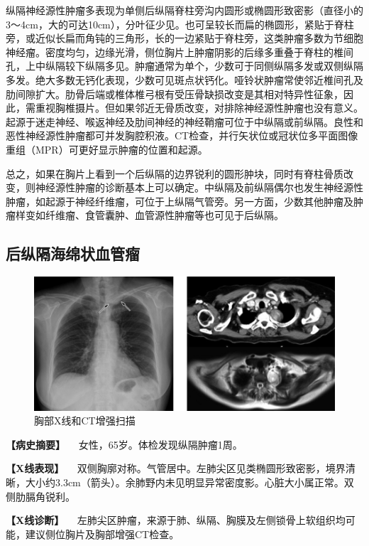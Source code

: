 纵隔神经源性肿瘤多表现为单侧后纵隔脊柱旁沟内圆形或椭圆形致密影（直径小的3～4cm，大的可达10cm），分叶征少见。也可呈较长而扁的椭圆形，紧贴于脊柱旁，或近似长扁而角钝的三角形，长的一边紧贴于脊柱旁，这类肿瘤多数为节细胞神经瘤。密度均匀，边缘光滑，侧位胸片上肿瘤阴影的后缘多重叠于脊柱的椎间孔，上中纵隔较下纵隔多见。肿瘤通常为单个，少数可于同侧纵隔多发或双侧纵隔多发。绝大多数无钙化表现，少数可见斑点状钙化。哑铃状肿瘤常使邻近椎间孔及肋间隙扩大。肋骨后端或椎体椎弓根有受压骨缺损改变是其相对特异性征象，因此，需重视胸椎摄片。但如果邻近无骨质改变，对排除神经源性肿瘤也没有意义。起源于迷走神经、喉返神经及肋间神经的神经鞘瘤可位于中纵隔或前纵隔。良性和恶性神经源性肿瘤都可并发胸腔积液。CT检查，并行矢状位或冠状位多平面图像重组（MPR）可更好显示肿瘤的位置和起源。

总之，如果在胸片上看到一个后纵隔的边界锐利的圆形肿块，同时有脊柱骨质改变，则神经源性肿瘤的诊断基本上可以确定。中纵隔及前纵隔偶尔也发生神经源性肿瘤，如起源于神经纤维瘤，可位于上纵隔气管旁。另一方面，少数其他肿瘤及肿瘤样变如纤维瘤、食管囊肿、血管源性肿瘤等也可见于后纵隔。

\subsection{后纵隔海绵状血管瘤}

\begin{figure}[!htbp]
 \centering
 \includegraphics{./images/Image00201.jpg}
 \captionsetup{justification=centering}
 \caption{胸部X线和CT增强扫描}
 \label{fig3-12-8}
  \end{figure} 

\textbf{【病史摘要】} 　女性，65岁。体检发现纵隔肿瘤1周。

\textbf{【X线表现】}
　双侧胸廓对称。气管居中。左肺尖区见类椭圆形致密影，境界清晰，大小约3.3cm（箭头）。余肺野内未见明显异常密度影。心脏大小属正常。双侧肋膈角锐利。

\textbf{【X线诊断】}
　左肺尖区肿瘤，来源于肺、纵隔、胸膜及左侧锁骨上软组织均可能，建议侧位胸片及胸部增强CT检查。

